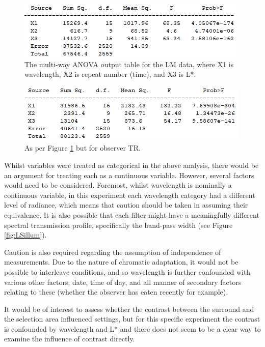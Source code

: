 \begin{figure}[htbp]
\includegraphics[max width=\textwidth]{figs/LargeSphere/anova.png}
\caption{The multi-way ANOVA output table for the LM data, where X1 is wavelength, X2 is repeat number (time), and X3 is L*.}
\label{fig:anova}
\end{figure}

\begin{figure}[htbp]
\includegraphics[max width=\textwidth]{figs/LargeSphere/anova2.png}
\caption{As per Figure \ref{fig:anova} but for observer TR.}
\label{fig:anova2}
\end{figure}

Whilst variables were treated as categorical in the above analysis, there would be an argument for treating each as a continuous variable. However, several factors would need to be considered. Foremost, whilst wavelength is nominally a continuous variable, in this experiment each wavelength category had a different level of radiance, which means that caution should be taken in assuming their equivalence. It is also possible that each filter might have a meaningfully different spectral transmission profile, specifically the band-pass width (see Figure \ref{fig:LSillum}).

Caution is also required regarding the assumption of independence of measurements. Due to the nature of chromatic adaptation, it would not be possible to interleave conditions, and so wavelength is further confounded with various other factors; date, time of day, and all manner of secondary factors relating to these (whether the observer has eaten recently for example).

It would be of interest to assess whether the contrast between the surround and the selection area influenced settings, but for this specific experiment the contrast is confounded by wavelength and L* and there does not seem to be a clear way to examine the influence of contrast directly.

